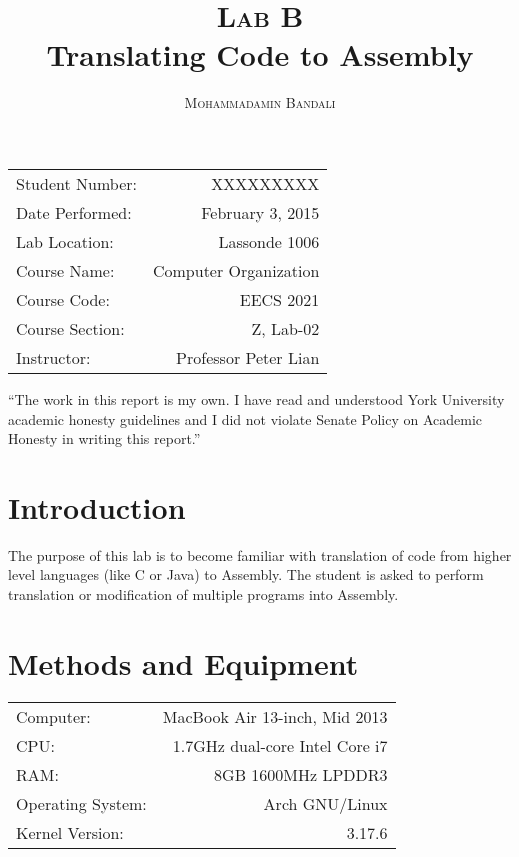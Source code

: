\documentclass{article}
\title{\textsc{Lab B} \\ Translating Code to Assembly } %
\author{\textsc{Mohammadamin Bandali}} %
\date{} %
\newenvironment{statement}{\par\vspace{50ex}}{\clearpage}
\begin{document}
\maketitle %

\begin{center}
\begin{tabular}{l r}
Student Number: & XXXXXXXXX \\ 
Date Performed: & February 3, 2015 \\ %
Lab Location: & Lassonde 1006 \\ 
Course Name: & Computer Organization \\ 
Course Code: & EECS 2021 \\ 
Course Section: & Z, Lab-02\\ 
Instructor: & Professor Peter Lian %
\end{tabular}
\end{center}

\begin{statement}
“The work in this report is my own. I have read and understood York University
academic honesty guidelines and I did not violate Senate Policy on Academic
Honesty in writing this report.”
\end{statement}


\section{Introduction}

The purpose of this lab is to become familiar with translation of code from higher level languages (like C or Java) to Assembly. The student is asked to perform translation or modification of multiple programs into Assembly. 


\section{Methods and Equipment}

\begin{center}
\begin{tabular}{l r}
Computer: & MacBook Air 13-inch, Mid 2013 \\
CPU: & 1.7GHz dual-core Intel Core i7 \\
RAM: & 8GB 1600MHz LPDDR3 \\
Operating System: & Arch GNU/Linux \\
Kernel Version: & 3.17.6
\end{tabular}
\end{center}
\end{document}
